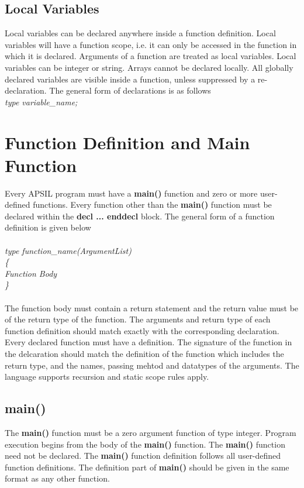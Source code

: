 \documentclass[11pt]{article}
\begin{document}
\subsection{Local Variables}
Local variables can be declared anywhere inside a function definition. Local variables will have a function scope, i.e. it can only be accessed in the function in which it is declared. Arguments of a function are treated as local variables. Local variables can be integer or string. Arrays cannot be declared locally. All globally declared variables are visible inside a function, unless suppressed by a re-declaration. The general form of declarations is as follows \\

\textit{type variable\_name;} 



\section{Function Definition and Main Function}

Every APSIL program must have a \textbf{main()} function and zero or more user-defined functions. Every function other than the \textbf{main()} function must be declared within the \textbf{decl ... enddecl} block. The general form of a function definition is given below 
\\
\\
\textit{
type function\_name(ArgumentList) \\ \{ \\
  Function Body \\
\}
}
\\
\\
The function body must contain a return statement and the return value must be of the return type of the function. The arguments and return type of each function definition should match exactly with the corresponding declaration. Every declared function must have a definition. The signature of the function in the delcaration should match the definition of the function which includes the return type, and the names, passing mehtod and datatypes of the arguments. The language supports recursion and static scope rules apply.

\subsection{main()}
The \textbf{main()} function must be a zero argument function of type integer. Program execution begins from the body of the \textbf{main()} function. The \textbf{main()} function need not be declared. The \textbf{main()} function definition follows all user-defined function definitions.  The definition part of \textbf{main()} should be given in the same format as any other function.
\end{document}
